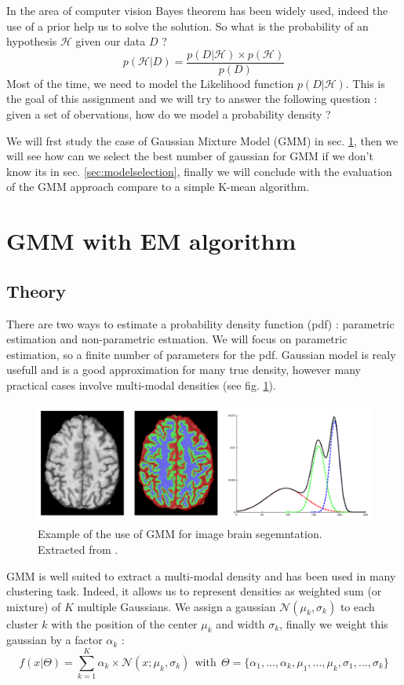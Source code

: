 \documentclass[runningheads,a4paper]{llncs}
\begin{document}
In the area of computer vision Bayes theorem has been widely used, indeed the use of a prior help us to solve the solution. So what is the probability of an hypothesis $\mathcal{H}$ given our data $D$ ?
\begin{equation}
p(\mathcal{H}|D)=\frac{p(D|\mathcal{H})\times p(\mathcal{H})}{p(D)}
\end{equation}
Most of the time, we need to model the Likelihood function $p(D|\mathcal{H})$. This is the goal of this assignment and we will try to answer the following question : given a set of obervations, how do we model a probability density ?\par
We will frst study the case of Gaussian Mixture Model (GMM) in sec. \ref{sec:gmm}, then we will see how can we select the best number of gaussian for GMM if we don't know its in sec. \ref{sec:modelselection}, finally we will conclude with the evaluation of the GMM approach compare to a simple K-mean algorithm.

\section{GMM with EM algorithm}\label{sec:gmm}
\subsection{Theory}
There are two ways to estimate a probability density function (pdf) : parametric estimation and non-parametric estmation. We will focus on parametric estimation, so a finite number of parameters for the pdf.
Gaussian model is realy usefull and is a good approximation for many true density, however many practical cases involve multi-modal densities (see fig. \ref{fig:gmm}). 

\begin{figure}
\centering
\includegraphics[height=4cm]{Figures/gmm}
\caption{Example of the use of GMM for image brain segemntation. Extracted from \cite{Arbel16}.}
\label{fig:gmm}
\end{figure}

GMM is well suited to extract a multi-modal density and has been used in many clustering task. Indeed, it allows us to represent densities as
weighted sum (or mixture) of $K$ multiple Gaussians. We assign a gaussian $\mathcal{N}(\mu_k,\sigma_k)$ to each cluster $k$ with the position of the center $\mu_k$ and width $\sigma_k$, finally we weight this gaussian by a factor $\alpha_k$ :
\begin{equation}
f(x|\Theta)=\sum^K_{k=1}\alpha_k\times\mathcal{N}(x;\mu_k,\sigma_k)
~~\textrm{with}~~
\Theta = \{\alpha_1,...,\alpha_k,\mu_1,...,\mu_k,\sigma_1,...,\sigma_k \}
\label{eq:gmm}
\end{equation}\par
\end{document}
